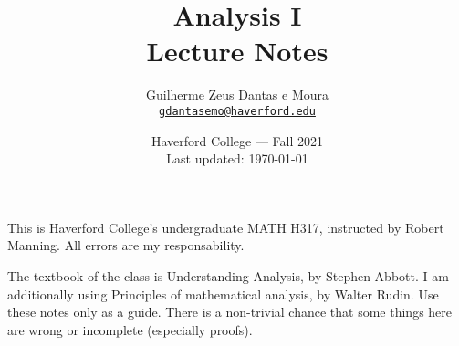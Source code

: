 \documentclass{scrbook}
\title{Analysis I\\Lecture Notes}
\author{Guilherme Zeus Dantas e Moura\\\href{mailto:gdantasemo@haverford.edu}{\texttt{gdantasemo@haverford.edu}}}
\date{Haverford College --- Fall 2021\\Last updated: \today}
\begin{document}
	\maketitle

		This is Haverford College's undergraduate MATH H317, instructed by Robert Manning.
		All errors are my responsability.

		The textbook of the class is Understanding Analysis, by Stephen Abbott. I am additionally using Principles of mathematical analysis, by Walter Rudin.
		Use these notes only as a guide. There is a non-trivial chance that some things here are wrong or incomplete (especially proofs).
	

		\tableofcontents
		\newpage

	
	
	
	
	
	
	
	
	
	
	
	
	
	
	
	
	
	
	
	
	
	
	
	
	
	
	
	
	
	
	
	
	
	
	
	
	
\end{document}

